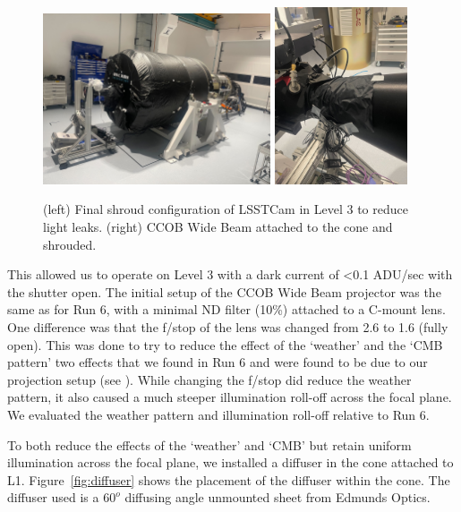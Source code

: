 \begin{figure}[htbp]
\centering
    \includegraphics[width=0.6\textwidth]{figures/Camera_Shroud.jpg} 
    \includegraphics[width=0.35\textwidth]{figures/CCOB_Wide_Shroud.jpg} \\
\caption{(left) Final shroud configuration of LSSTCam in Level 3 to reduce light leaks. (right) CCOB Wide Beam attached to the cone and shrouded.}
\label{fig:LSSTCam_config}
\end{figure}

This allowed us to operate on Level 3 with a dark current of \textless0.1 ADU/sec with the shutter open. The initial setup of the CCOB Wide Beam projector was the same as for Run 6, with a minimal ND filter (10\%) attached to a C-mount lens. One difference was that the f/stop of the lens was changed from 2.6 to 1.6 (fully open). This was done to try to reduce the effect of the `weather' and the `CMB pattern' two effects that we found in Run 6 and were found to be due to our projection setup (see \citet{2024arXiv241113386B}). While changing  the f/stop  did reduce the weather pattern, it also caused a much steeper illumination roll-off across the focal plane. We evaluated the weather pattern and illumination roll-off relative to Run 6.


To both reduce the effects of the `weather' and `CMB' but retain uniform illumination across the focal plane, we installed a diffuser in the cone attached to L1. Figure~\ref{fig:diffuser} shows the placement of the diffuser within the cone.  The diffuser used is a $60^o$ diffusing angle unmounted sheet from Edmunds Optics.

